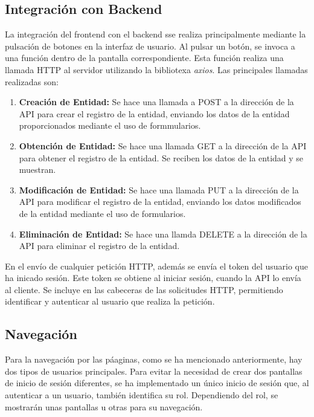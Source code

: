 \subsection{Integración con Backend}

La integración del frontend con el backend sse realiza principalmente mediante la pulsación de botones en la interfaz de usuario. Al pulsar un botón, se invoca a una función dentro de la pantalla correspondiente. Esta función realiza una llamada HTTP al servidor utilizando la bibliotexa \textit{axios}. Las principales llamadas realizadas son:

\begin{enumerate}
    \item \textbf{Creación de Entidad: }Se hace una llamada a POST a la dirección de la API para crear el registro de la entidad, enviando los datos de la entidad proporcionados mediante el uso de formmularios.
    \item \textbf{Obtención de Entidad: }Se hace una llamada GET a la dirección de la API para obtener el registro de la entidad. Se reciben los datos de la entidad y se muestran.
    \item \textbf{Modificación de Entidad: }Se hace una llamada PUT a la dirección de la API para modificar el registro de la entidad, enviando los datos modificados de la entidad mediante el uso de formularios.
    \item \textbf{Eliminación de Entidad: }Se hace una llamda DELETE a la dirección de la API para eliminar el registro de la entidad.
\end{enumerate}

En el envío de cualquier petición HTTP, además se envía el token del usuario que ha inicado sesión. Este token se obtiene al iniciar sesión, cuando la API lo envía al cliente. Se incluye en las cabeceras de las solicitudes HTTP, permitiendo identificar y autenticar al usuario que realiza la petición.

\subsection{Navegación}

Para la navegación por las páaginas, como se ha mencionado anteriormente, hay dos tipos de usuarios principales. Para evitar la necesidad de crear dos pantallas de inicio de sesión diferentes, se ha implementado un único inicio de sesión que, al autenticar a un usuario, también identifica su rol. Dependiendo del rol, se mostrarán unas pantallas u otras para su navegación.

